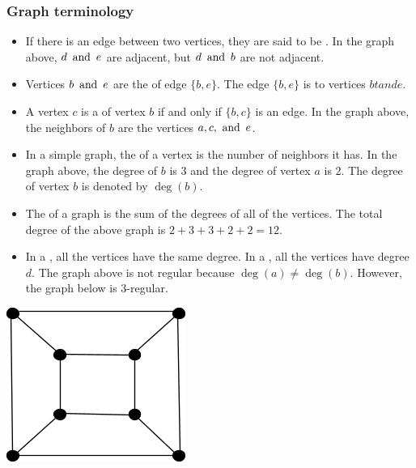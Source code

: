 \subsubsection*{Graph terminology}
\begin{center}
\end{center}
\begin{itemize}
  \item If there is an edge between two vertices, they are said to be . In the graph above, $d \operatorname{~\text{and}~} e$ are adjacent, but $d \operatorname{~\text{and}~} b$ are not adjacent.
  \item Vertices $b \operatorname{~\text{and}~} e$ are the  of edge $\{b,e\}$. The edge $\{b,e\}$ is  to vertices $b tand e$.
  \item A vertex $c$ is a  of vertex $b$ if and only if $\{b,c\}$ is an edge. In the graph above, the neighbors of $b$ are the vertices $a,c, \operatorname{~\text{and}~} e$.
  \item In a simple graph, the  of a vertex is the number of neighbors it has. In the graph above, the degree of $b$ is 3 and the degree of vertex $a$ is 2. The degree of vertex $b$ is denoted by $\deg(b)$.
  \item The  of a graph is the sum of the degrees of all of the vertices. The total degree of the above graph is $2 + 3 + 3 + 2 + 2 = 12$.
  \item In a , all the vertices have the same degree. In a , all the vertices have degree $d$. The graph above is not regular because $\deg(a) \neq \deg(b)$. However, the graph below is 3-regular.
\end{itemize}
\begin{center}
  \includegraphics[width=.2\linewidth]{resources/3-regular graph.png}
\end{center}
